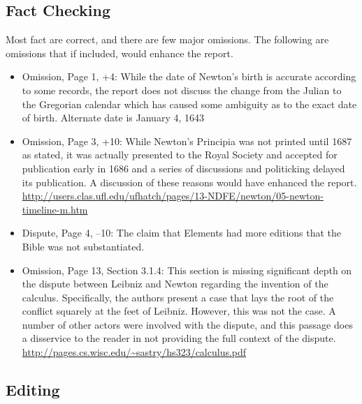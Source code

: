 \documentclass[11pt]{article}
\begin{document}
\subsection*{Fact Checking}
Most fact are correct, and there are few major omissions. The following are omissions that if included, would enhance the report.
\begin{itemize}
\item Omission, Page 1, +4: While the date of Newton's birth is accurate according to some records, the report does not discuss the change from the Julian to the Gregorian calendar which has caused some ambiguity as to the exact date of birth. Alternate date is January 4, 1643

\item Omission, Page 3, +10: While Newton's Principia was not printed until 1687 as stated, it was actually presented to the Royal Society and accepted for publication early in 1686 and a series of discussions and politicking delayed its publication. A discussion of these reasons would have enhanced the report. \url{http://users.clas.ufl.edu/ufhatch/pages/13-NDFE/newton/05-newton-timeline-m.htm}
\item Dispute, Page 4, --10: The claim that Elements had more editions that the Bible was not substantiated.
\item Omission, Page 13, Section 3.1.4: This section is missing significant depth on the dispute between Leibniz and Newton regarding the invention of the calculus. Specifically, the authors present a case that lays the root of the conflict squarely at the feet of Leibniz. However, this was not the case. A number of other actors were involved with the dispute, and this passage does a disservice to the reader in not providing the full context of the dispute. \url{http://pages.cs.wisc.edu/~sastry/hs323/calculus.pdf}
\end{itemize}

\subsection*{Editing}
\end{document}
